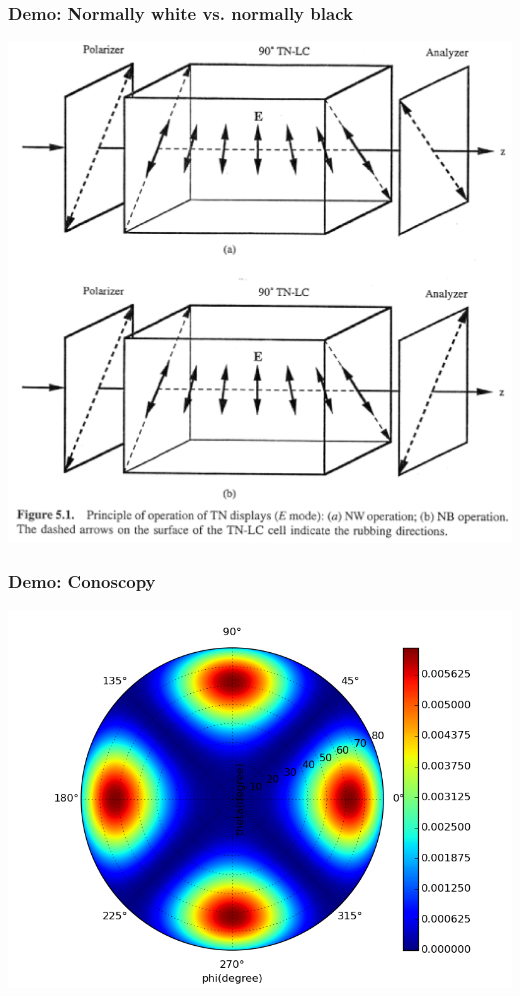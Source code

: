 \documentclass{beamer}
\begin{document}
\begin{frame}
\frametitle{Demo: Normally white vs. normally black}
\begin{center}
\includegraphics[scale=0.40]{TN_NW_NB.eps}\\
\end{center}
\end{frame}
\begin{frame}
\frametitle{Demo: Conoscopy}
\begin{center}
\includegraphics[scale=0.4]{conoscopy.png}
\end{center}
\end{frame}
\end{document}
